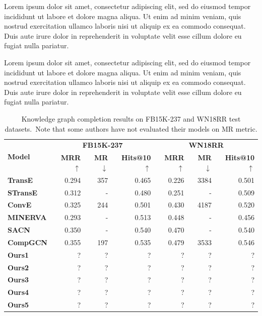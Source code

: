 \documentclass[longabstract, english, mgr]{iithesis}
\theoremstyle{default_theorem_style}\newtheorem{theorem}{Theorem}
\theoremstyle{default_theorem_style}\newtheorem{definition}{Definition}
\begin{document}
\noindent Lorem ipsum dolor sit amet, consectetur adipiscing elit, sed do eiusmod tempor incididunt ut
labore et dolore magna aliqua. Ut enim ad minim veniam, quis nostrud exercitation ullamco laboris nisi
ut aliquip ex ea commodo consequat. Duis aute irure dolor in reprehenderit in voluptate velit esse
cillum dolore eu fugiat nulla pariatur. \newline

\noindent Lorem ipsum dolor sit amet, consectetur adipiscing elit, sed do eiusmod tempor incididunt ut
labore et dolore magna aliqua. Ut enim ad minim veniam, quis nostrud exercitation ullamco laboris nisi
ut aliquip ex ea commodo consequat. Duis aute irure dolor in reprehenderit in voluptate velit esse
cillum dolore eu fugiat nulla pariatur. \newline

\begin{table}[!t]
\centering
\def\arraystretch{1.1}
\begin{tabular}{|l || r | r | r || r | r | r |}
 \hline
 \multirow{2}{*}{\textbf{Model}} & \multicolumn{3}{c||}{\textbf{FB15K-237}} & \multicolumn{3}{c|}{\textbf{WN18RR}} \\
 \cline{2-7}
 & \textbf{MRR} $\uparrow$ & \textbf{MR} $\downarrow$ & \textbf{Hits@10} $\uparrow$ & \textbf{MRR} $\uparrow$ &
 \textbf{MR} $\downarrow$ & \textbf{Hits@10} $\uparrow$ \\
 \Xhline{4\arrayrulewidth}
 \textbf{TransE} & 0.294 & 357 & 0.465 & 0.226 & 3384 & 0.501 \\
 \hline
 \textbf{STransE} & 0.312 & - & 0.480 & 0.251 & - & 0.509 \\
 \hline
 \textbf{ConvE} & 0.325 & 244 & 0.501 & 0.430 & 4187 & 0.520 \\
 \hline
 \textbf{MINERVA} & 0.293 & - & 0.513 & 0.448 & - & 0.456 \\
 \hline
 \textbf{SACN} & 0.350 & - & 0.540 & 0.470 & - & 0.540 \\
 \hline
 \textbf{CompGCN} & 0.355 & 197 & 0.535 & 0.479 & 3533 & 0.546 \\
 \hline
 \textbf{Ours1} & ? & ? & ? & ? & ? & ? \\
 \hline
 \textbf{Ours2} & ? & ? & ? & ? & ? & ? \\
 \hline
 \textbf{Ours3} & ? & ? & ? & ? & ? & ? \\
 \hline
 \textbf{Ours4} & ? & ? & ? & ? & ? & ? \\
 \hline
 \textbf{Ours5} & ? & ? & ? & ? & ? & ? \\
 \hline
\end{tabular}
\caption{Knowledge graph completion results on FB15K-237 and WN18RR test datasets.\ Note that some authors have not
evaluated their models on MR metric.}
\label{tab:full_results}
\end{table}
\end{document}
